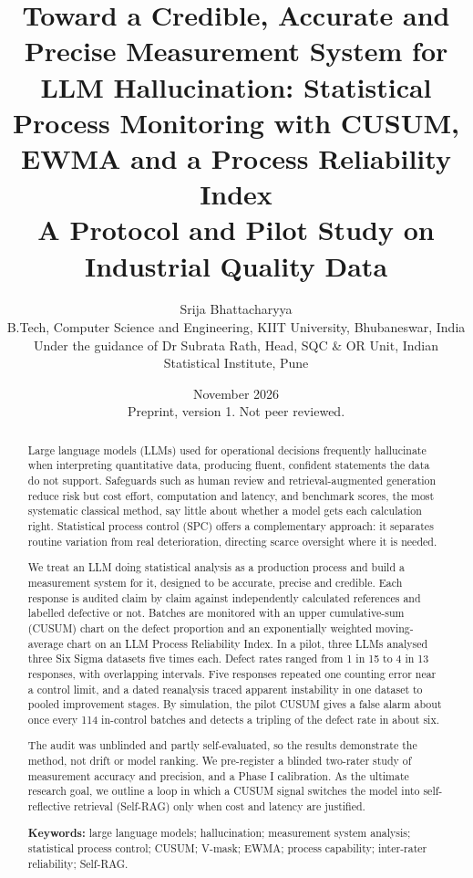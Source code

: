 \documentclass[11pt]{article}
\title{Toward a Credible, Accurate and Precise Measurement System for LLM Hallucination: Statistical Process Monitoring with CUSUM, EWMA and a Process Reliability Index\\[0.3em]
\large A Protocol and Pilot Study on Industrial Quality Data}
\author{Srija Bhattacharyya\\[0.2em]
\small B.Tech, Computer Science and Engineering, KIIT University, Bhubaneswar, India\\
\small Under the guidance of Dr Subrata Rath, Head, SQC \& OR Unit, Indian Statistical Institute, Pune}
\date{November 2026\\[0.3em]\small Preprint, version 1. Not peer reviewed.}
\begin{document}
\maketitle

\begin{abstract}
\noindent Large language models (LLMs) used for operational decisions frequently hallucinate when interpreting quantitative data, producing fluent, confident statements the data do not support. Safeguards such as human review and retrieval-augmented generation reduce risk but cost effort, computation and latency, and benchmark scores, the most systematic classical method, say little about whether a model gets each calculation right. Statistical process control (SPC) offers a complementary approach: it separates routine variation from real deterioration, directing scarce oversight where it is needed.\par\smallskip\noindent We treat an LLM doing statistical analysis as a production process and build a measurement system for it, designed to be accurate, precise and credible. Each response is audited claim by claim against independently calculated references and labelled defective or not. Batches are monitored with an upper cumulative-sum (CUSUM) chart on the defect proportion and an exponentially weighted moving-average chart on an LLM Process Reliability Index. In a pilot, three LLMs analysed three Six Sigma datasets five times each. Defect rates ranged from 1 in 15 to 4 in 13 responses, with overlapping intervals. Five responses repeated one counting error near a control limit, and a dated reanalysis traced apparent instability in one dataset to pooled improvement stages. By simulation, the pilot CUSUM gives a false alarm about once every 114 in-control batches and detects a tripling of the defect rate in about six.\par\smallskip\noindent The audit was unblinded and partly self-evaluated, so the results demonstrate the method, not drift or model ranking. We pre-register a blinded two-rater study of measurement accuracy and precision, and a Phase I calibration. As the ultimate research goal, we outline a loop in which a CUSUM signal switches the model into self-reflective retrieval (Self-RAG) only when cost and latency are justified.

\medskip\noindent\textbf{Keywords:} large language models; hallucination; measurement system analysis; statistical process control; CUSUM; V-mask; EWMA; process capability; inter-rater reliability; Self-RAG.
\end{abstract}
\end{document}
